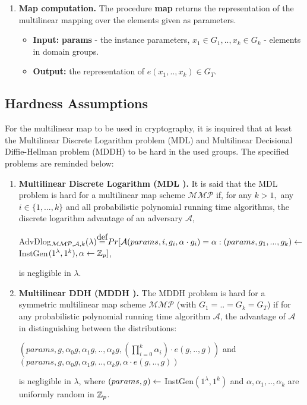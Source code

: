 \begin{enumerate}[label=(\alph*)]
	\item \textbf{Map computation.} The procedure \textbf{map} returns the representation of the multilinear mapping over the elements given as parameters.
\begin{itemize}
	\item \textbf{Input:} \textbf{params} - the instance parameters, $x_1\in G_1, .., x_k \in G_k$ - elements in domain groups.
	\item \textbf{Output:} the representation of $e(x_1,..,x_k) \in G_T$.
\end{itemize}
\end{enumerate}

\subsection{Hardness Assumptions}
For the multilinear map to be used in cryptography, it is inquired that at least the Multilinear Discrete Logarithm problem (MDL) and Multilinear Decisional Diffie-Hellman problem (MDDH) to be hard in the used groups. The specified problems are reminded below:

\begin{enumerate}
	\item \textbf{Multilinear Discrete Logarithm (MDL \cite{GGH13}).} It is said that the MDL problem is hard for a multilinear map scheme $\mathcal{MMP}$ if, for any $k > 1, $ any $i\in \{1,...,k\}$ and all probabilistic polynomial running time algorithms, the discrete logarithm advantage of an adversary $\mathcal{A}$,
	\begin{center}
		AdvDlog$_{\mathcal{MMP, A}, k}(\lambda) \stackrel{\mathclap{\normalfont\mbox{def}}}{=} Pr[\mathcal{A}(params, i, g_i, \alpha \cdot g_i) = \alpha : (params, g_1, ..., g_k) \la$ InstGen$(1^\lambda, 1^k), \alpha \leftarrow {\mathbb Z}_p] $,
	\end{center}
	is negligible in $\lambda$.
	
	\item \textbf{Multilinear DDH (MDDH \cite{GGH13}).} The MDDH problem is hard for a symmetric multilinear map scheme $\mathcal{MMP}$ (with $G_1=..=G_k = G_T$) if for any probabilistic polynomial running time algorithm $\mathcal{A}$, the advantage of $\mathcal{A}$ in distinguishing between the distributions:
	
	\begin{center}
		$(params, g, \alpha_0g, \alpha_1g,..,\alpha_kg, (\displaystyle{\prod_{i=0}^{k}}\alpha_i)\cdot e(g,..,g))$ and \\
		$(params, g, \alpha_0g, \alpha_1g,..,\alpha_kg, \alpha \cdot e(g,..,g))$
	\end{center}
	is negligible in $\lambda$, where $(params, g)\leftarrow$ InstGen$(1^\lambda, 1^k)$ and $\alpha, \alpha_1, .., \alpha_k$ are uniformly random in ${\mathbb Z}_p$.
\end{enumerate}


